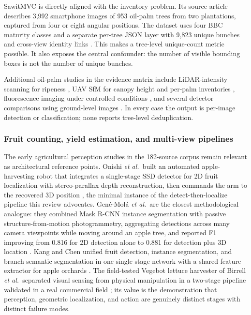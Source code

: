 SawitMVC is directly aligned with the inventory problem. Its source article describes 3{,}992 smartphone images of 953 oil-palm trees from two plantations, captured from four or eight angular positions. The dataset uses four BBC maturity classes and a separate per-tree JSON layer with 9{,}823 unique bunches and cross-view identity links \cite{indriani2026sawitmvc}. This makes a tree-level unique-count metric possible. It also exposes the central confounder: the number of visible bounding boxes is not the number of unique bunches.

Additional oil-palm studies in the evidence matrix include LiDAR-intensity scanning for ripeness \cite{ledger_r_97003608b250cdc5}, UAV SfM for canopy height and per-palm inventories \cite{ledger_m_084cfd5badbb63d3}, fluorescence imaging under controlled conditions \cite{ledger_r_1c81e223679e4bfe}, and several detector comparisons using ground-level images \cite{ledger_r_134385f2faed38a6}. In every case the output is per-image detection or classification; none reports tree-level deduplication.

\subsubsection{Fruit counting, yield estimation, and multi-view pipelines}

The early agricultural perception studies in the 182-source corpus remain relevant as architectural reference points. Onishi \textit{et al.}\ built an automated apple-harvesting robot that integrates a single-stage SSD detector for 2D fruit localization with stereo-parallax depth reconstruction, then commands the arm to the recovered 3D position \cite{onishi2019harvest}, the minimal instance of the detect-then-localize pipeline this review advocates. Gené-Molá \textit{et al.}\ are the closest methodological analogue: they combined Mask R-CNN instance segmentation with passive structure-from-motion photogrammetry, aggregating detections across many camera viewpoints while moving around an apple tree, and reported F1 improving from 0.816 for 2D detection alone to 0.881 for detection plus 3D location \cite{genemola2020fruit3d}. Kang and Chen unified fruit detection, instance segmentation, and branch semantic segmentation in one single-stage network with a shared feature extractor for apple orchards \cite{kang2020strawberry}. The field-tested Vegebot lettuce harvester of Birrell \textit{et al.}\ separated visual sensing from physical manipulation in a two-stage pipeline validated in a real commercial field \cite{birrell2020lettuce}; its value is the demonstration that perception, geometric localization, and action are genuinely distinct stages with distinct failure modes.

